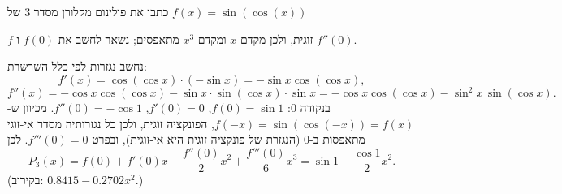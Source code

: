 
\begin{question}
כתבו את פולינום מקלורן מסדר 3 של $f(x)=\sin(\cos(x))$
\end{question}

\begin{hint}
$f$ זוגית, ולכן מקדם $x$ ומקדם $x^3$ מתאפסים; נשאר לחשב את $f(0)$ ו-$f''(0)$.
\end{hint}

\begin{solution}
נחשב נגזרות לפי כלל השרשרת:
\[ f'(x)=\cos(\cos x)\cdot(-\sin x)=-\sin x\cos(\cos x), \]
\[ f''(x)=-\cos x\cos(\cos x)-\sin x\cdot\sin(\cos x)\cdot\sin x=-\cos x\cos(\cos x)-\sin^2x\,\sin(\cos x). \]
בנקודה $0$: $f(0)=\sin1$, $f'(0)=0$, $f''(0)=-\cos1$. מכיוון ש-$f(-x)=\sin(\cos(-x))=f(x)$, הפונקציה זוגית, ולכן כל נגזרותיה מסדר אי-זוגי מתאפסות ב-$0$ (הנגזרת של פונקציה זוגית היא אי-זוגית), ובפרט $f'''(0)=0$. לכן
\[ P_3(x)=f(0)+f'(0)x+\frac{f''(0)}{2}x^2+\frac{f'''(0)}{6}x^3=\boxed{\sin1-\frac{\cos1}{2}x^2}. \]
(בקירוב: $0.8415-0.2702x^2$.)
\end{solution}
